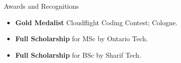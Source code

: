 	\begin{cvsection}{Awards and Recognitions}
		\begin{cvsubsection}{}{}{}	
			\begin{itemize}
				\item \textbf{Gold Medalist} Cloudflight Coding Contest; Cologne.
				\item \textbf{Full Scholarship} for MSc by Ontario Tech.
				\item \textbf{Full Scholarship} for BSc by Sharif Tech.
			\end{itemize}
		\end{cvsubsection}
	\end{cvsection}